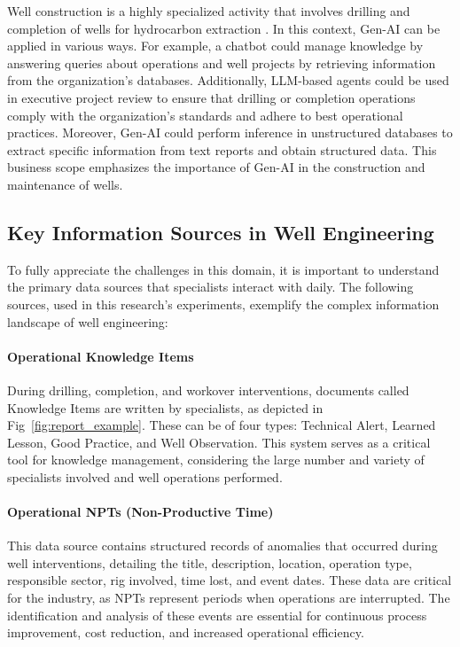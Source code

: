     Well construction is a highly specialized activity that involves drilling and completion of wells for hydrocarbon extraction \citep{Thomas2004}. In this context, Gen-AI can be applied in various ways. 
    For example, a chatbot could manage knowledge by answering queries about operations and well projects by retrieving information from the organization's databases. 
    Additionally, LLM-based agents could be used in executive project review to ensure that drilling or completion operations comply with the organization's standards and adhere to best operational practices. 
    Moreover, Gen-AI could perform inference in unstructured databases to extract specific information from text reports and obtain structured data. This business scope emphasizes the importance of Gen-AI in the construction and maintenance of wells.

    \subsection{Key Information Sources in Well Engineering} \label{sec:information-sources}

        To fully appreciate the challenges in this domain, it is important to understand the primary data sources that specialists interact with daily. The following sources, used in this research's experiments, exemplify the complex information landscape of well engineering:

        \paragraph{Operational Knowledge Items} During drilling, completion, and workover interventions, documents called Knowledge Items are written by specialists, as depicted in Fig~\ref{fig:report_example}. These can be of four types: Technical Alert, Learned Lesson, Good Practice, and Well Observation. This system serves as a critical tool for knowledge management, considering the large number and variety of specialists involved and well operations performed.

        \paragraph{Operational NPTs (Non-Productive Time)} This data source contains structured records of anomalies that occurred during well interventions, detailing the title, description, location, operation type, responsible sector, rig involved, time lost, and event dates. These data are critical for the industry, as NPTs represent periods when operations are interrupted. The identification and analysis of these events are essential for continuous process improvement, cost reduction, and increased operational efficiency.

